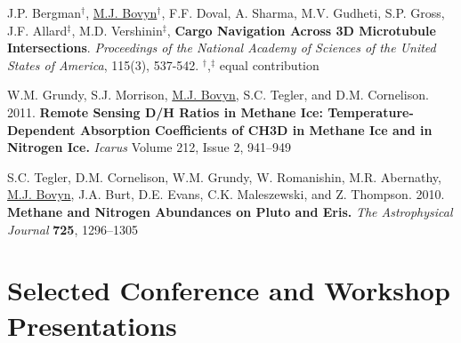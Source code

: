 \documentclass[letterpaper,10pt]{article} %
\begin{document}
\begin{description}[itemsep=-1ex]
\item J.P. Bergman$^\dagger$, \underline{M.J. Bovyn}$^\dagger$, F.F. Doval, A. Sharma, M.V. Gudheti, S.P. Gross, J.F. Allard$^\ddagger$, M.D. Vershinin$^\ddagger$, \textbf{Cargo Navigation Across 3D Microtubule Intersections}. \textit{Proceedings of the National Academy of Sciences of the United States of America}, 115(3), 537-542. $^\dagger$,$^\ddagger$ equal contribution

\item W.M. Grundy, S.J. Morrison, \underline{M.J. Bovyn}, S.C. Tegler, and D.M. Cornelison. 2011. \textbf{Remote Sensing D/H Ratios in Methane Ice: Temperature-Dependent Absorption Coefficients of CH3D in Methane Ice and in Nitrogen Ice.} \textit{Icarus} Volume 212, Issue 2, 941--949

\item S.C. Tegler, D.M. Cornelison, W.M. Grundy, W. Romanishin, M.R. Abernathy, \underline{M.J. Bovyn}, J.A. Burt, D.E. Evans, C.K. Maleszewski, and Z. Thompson. 2010. \textbf{Methane and Nitrogen Abundances on Pluto and Eris.} \textit{The Astrophysical Journal} \textbf{725}, 1296--1305
\end{description}


\section*{Selected Conference and Workshop Presentations}
\end{document}
